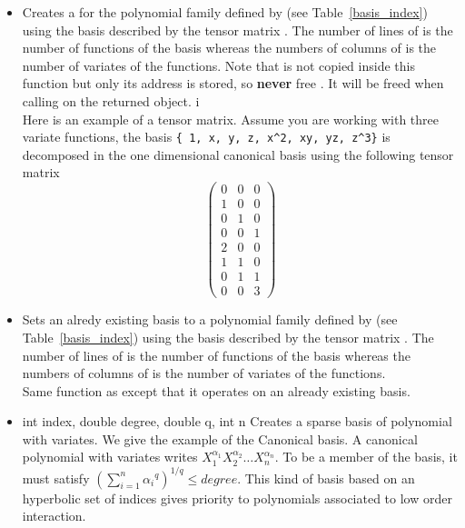 \begin{itemize}
\item {}
  \sshortdescribe Creates a  for the polynomial family
  defined by  (see Table~\ref{basis_index}) using the basis
  described by the tensor matrix . The number of lines of  is
  the number of functions of the basis whereas the numbers of columns of
   is the number of variates of the functions.
  Note that  is not copied inside this function but only its address is
  stored, so {\bf never} free . It will be freed when calling
   on the returned object. i\\
  Here is an example of a tensor matrix. Assume you are working with three
  variate functions, the basis \verb!{ 1, x, y, z, x^2, xy, yz, z^3}! is
  decomposed in the one dimensional canonical basis using the following tensor
  matrix
  \[ \left(
    \begin{array}{ccc}
      0 & 0 & 0 \\
      1 & 0 & 0 \\
      0 & 1 & 0 \\
      0 & 0 & 1 \\
      2 & 0 & 0 \\
      1 & 1 & 0 \\
      0 & 1 & 1\\
      0 & 0 & 3
    \end{array}
  \right) \]

\item {}
  \sshortdescribe Sets an alredy existing basis  to a polynomial family
  defined by  (see Table~\ref{basis_index}) using the basis
  described by the tensor matrix . The number of lines of  is
  the number of functions of the basis whereas the numbers of columns of
   is the number of variates of the functions. \\
  Same function as  except that it
  operates on an already existing basis.

\item  {}
  {int index, double degree, double q, int n}
  \sshortdescribe Creates a sparse basis of polynomial with 
  variates. We give the example of the Canonical basis. A canonical polynomial
  with  variates writes $X_1^{\alpha_1} X_2^{\alpha_2} \dots
  X_n^{\alpha_n}$. To be a member of the basis, it must satisfy $\left(\sum_{i=1}^n
    {\alpha_i}^q \right)^{1/q} \leq degree$. This kind of basis based on an
  hyperbolic set of indices gives priority to polynomials associated to low
  order interaction.

\end{itemize}


